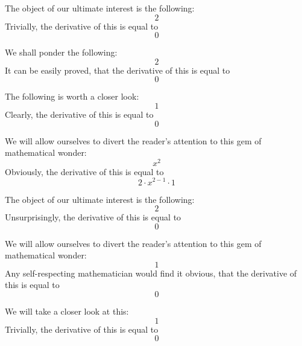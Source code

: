 \documentclass{article}
\begin{document}
The object of our ultimate interest is the following:
\begin{equation}
2 
\end{equation}
Trivially, the derivative of this is equal to
\begin{equation}
0 
\end{equation}

We shall ponder the following:
\begin{equation}
2 
\end{equation}
It can be easily proved, that the derivative of this is equal to
\begin{equation}
0 
\end{equation}

The following is worth a closer look:
\begin{equation}
1 
\end{equation}
Clearly, the derivative of this is equal to
\begin{equation}
0 
\end{equation}

We will allow ourselves to divert the reader's attention to this gem of mathematical wonder:
\begin{equation}
x ^{2 } 
\end{equation}
Obviously, the derivative of this is equal to
\begin{equation}
2 \cdot x ^{2 - 1 } \cdot 1 
\end{equation}

The object of our ultimate interest is the following:
\begin{equation}
2 
\end{equation}
Unsurprisingly, the derivative of this is equal to
\begin{equation}
0 
\end{equation}

We will allow ourselves to divert the reader's attention to this gem of mathematical wonder:
\begin{equation}
1 
\end{equation}
Any self-respecting mathematician would find it obvious, that the derivative of this is equal to
\begin{equation}
0 
\end{equation}

We will take a closer look at this:
\begin{equation}
1 
\end{equation}
Trivially, the derivative of this is equal to
\begin{equation}
0 
\end{equation}
\end{document}

